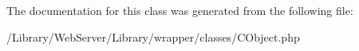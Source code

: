 The documentation for this class was generated from the following file\-:\begin{DoxyCompactItemize}
\item 
/\-Library/\-Web\-Server/\-Library/wrapper/classes/C\-Object.\-php\end{DoxyCompactItemize}
